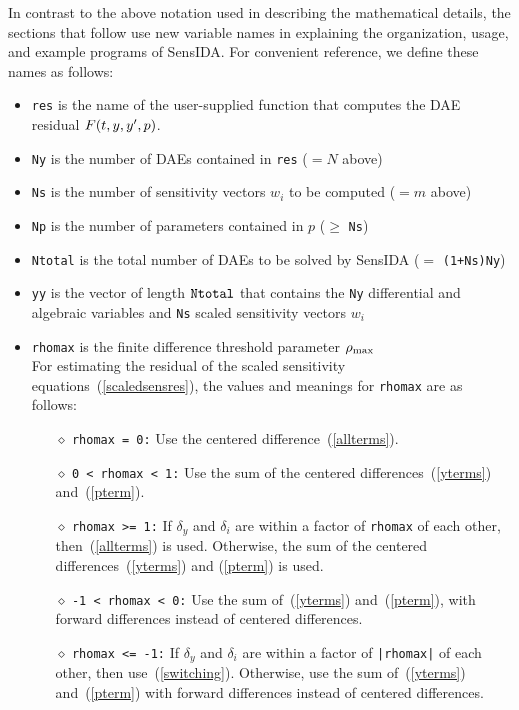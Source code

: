 In contrast to the above notation used in describing the mathematical
details, the sections that follow use new variable names in
explaining the organization, usage, and example programs of SensIDA.
For convenient reference, we define these names as follows:
\begin{itemize}
\item {\tt res} is the name of the user-supplied function that 
computes the DAE residual $F(t,y,y^{\prime},p)$.
\item {\tt Ny} is the number of DAEs contained in {\tt res} ($=N$
above)
\item {\tt Ns} is the number of sensitivity vectors $w_i$ to be
computed ($=m$ above)
\item {\tt Np} is the number of parameters contained in $p$ ($\geq$
{\tt Ns})
\item {\tt Ntotal} is the total number of DAEs to be solved by SensIDA
($=$ {\tt (1+Ns)Ny})
\item {\tt yy} is the vector of length ${\tt Ntotal}$ that contains
the {\tt Ny} differential and algebraic variables and {\tt Ns} scaled
sensitivity vectors $w_i$
\item {\tt rhomax} is the finite difference threshold parameter
$\rho_{\max}$ \\
For estimating the residual of the scaled sensitivity equations~(\ref{scaledsensres}), 
the values and meanings for {\tt rhomax} are as follows:
\begin{itemize}
\item [$\diamond$] {\tt rhomax = 0:} 
Use the centered difference~(\ref{allterms}).
\item [$\diamond$] {\tt 0 < rhomax < 1:} 
Use the sum of the centered differences~(\ref{yterms}) and~(\ref{pterm}).
\item [$\diamond$] {\tt rhomax >= 1:}
If $\delta_y$ and $\delta_i$ are within a factor of {\tt rhomax} of
each other, then~(\ref{allterms}) is used.
Otherwise, the sum of the centered differences~(\ref{yterms}) and
(\ref{pterm}) is used.
\item [$\diamond$] {\tt -1 < rhomax < 0:} 
Use the sum of~(\ref{yterms}) and~(\ref{pterm}), with forward
differences instead of centered differences.
\item [$\diamond$] {\tt rhomax <= -1:}
If $\delta_y$ and $\delta_i$ are within a factor of {\tt |rhomax|} of
each other, then use~(\ref{switching}).
Otherwise, use the sum of~(\ref{yterms}) and~(\ref{pterm}) with
forward differences instead of centered differences.
\end{itemize}
\end{itemize}

